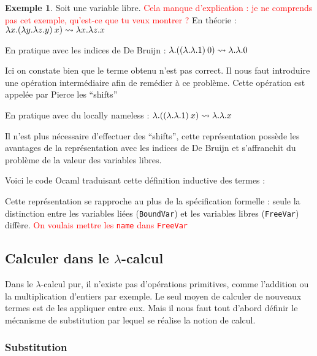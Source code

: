 \documentclass {article}
\newcommand{\codefrom}[3]
           {}
\theoremstyle{definition}
\newtheorem{example}{Exemple}
\theoremstyle{remark}
\newcommand{\todo}[1]{\textcolor{red}{#1}}
\newcommand{\fun}[1]{\lstinline!#1!}
\begin{document}
\begin{example} 
  
  Soit  une variable libre. \todo{Cela manque d'explication : je ne comprends pas cet exemple, qu'est-ce que tu veux montrer ?}
  En théorie : 
  \(\lambda x. (\lambda y. \lambda z. y)\:x) \leadsto \lambda x. \lambda z. x\)

  En pratique avec les indices de De Bruijn : $\lambda . ((\lambda . \lambda . 1)\:0) \leadsto \lambda . \lambda . 0$

  Ici on constate bien que le terme obtenu n'est pas correct. Il nous faut introduire une opération
  intermédiaire afin de remédier à ce problème.
  Cette opération est appelée par Pierce les ``shifts''
  
  En pratique avec du locally nameless : $\lambda . ((\lambda . \lambda . 1)\:x)\leadsto \lambda . \lambda . x$

  Il n'est plus nécessaire d'effectuer des ``shifts'', cette représentation
  possède les avantages de la représentation avec les indices de De Bruijn et
  s'affranchit du problème de la valeur des variables libres.
  
\end{example}

Voici le code Ocaml traduisant cette définition inductive des termes :
%
\codefrom{untyped}{lambda}{untyped_term}

Cette représentation se rapproche au plus de la spécification formelle
: seule la distinction entre les variables liées (\lstinline!BoundVar!)
et les variables libres (\lstinline!FreeVar!) diffère. \todo{On voulais mettre les \fun{name} dans \fun{FreeVar}}



  
\subsection{Calculer dans le $\lambda$-calcul}
\label{calculer_dans_le_lambda_calcul}

Dans le $\lambda$-calcul pur, il n'existe pas d'opérations primitives, comme l'addition ou la multiplication d'entiers par exemple. Le seul moyen de calculer de nouveaux termes est de les appliquer 
entre eux. Mais il nous faut tout d'abord définir le mécanisme de substitution par lequel se réalise la notion de calcul.

\subsubsection{Substitution}
\end{document}
